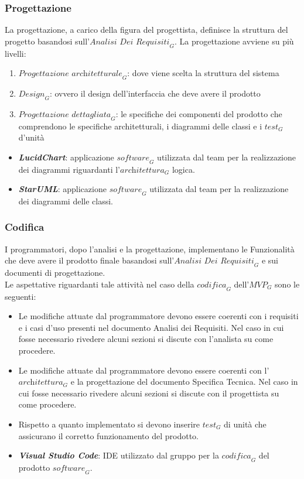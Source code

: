 \subsubsection{Progettazione}
La progettazione, a carico della figura del progettista, definisce la struttura del progetto basandosi sull'$\textit{Analisi Dei Requisiti}_G$.
La progettazione avviene su più livelli:
\begin{enumerate}
    \item $\textit{Progettazione architetturale}_G$: dove viene scelta la struttura del sistema
    \item $\textit{Design}_G$: ovvero il design dell'interfaccia che deve avere il prodotto
    \item $\textit{Progettazione dettagliata}_G$: le specifiche dei componenti del prodotto che comprendono le specifiche architetturali, i diagrammi delle classi e i $\textit{test}_G$ d'unità
\end{enumerate}
\begin{itemize}
    \item \emph{\textbf{LucidChart}}: applicazione $\textit{software}_G$ utilizzata dal team per la realizzazione dei diagrammi riguardanti l'$\textit{architettura}_G$ logica.
    \item \emph{\textbf{StarUML}}: applicazione $\textit{software}_G$ utilizzata dal team per la realizzazione dei diagrammi delle classi.
\end{itemize}
\subsubsection{Codifica}
I programmatori, dopo l'analisi e la progettazione, implementano le Funzionalità che deve avere il prodotto finale basandosi sull'$\textit{Analisi Dei Requisiti}_G$ e sui documenti di progettazione.\\
Le aspettative riguardanti tale attività nel caso della $\textit{codifica}_G$ dell'$\textit{MVP}_G$ sono le seguenti:
\begin{itemize}
    \item  Le modifiche attuate dal programmatore devono essere coerenti con i requisiti e i casi d'uso presenti nel documento Analisi dei Requisiti.
    Nel caso in cui fosse necessario rivedere alcuni sezioni si discute con l'analista su come procedere.
    \item Le modifiche attuate dal programmatore devono essere coerenti con l'$\textit{architettura}_G$ e la progettazione del documento Specifica Tecnica. Nel caso in cui fosse necessario rivedere alcuni sezioni si discute con il progettista su come procedere.
    \item Rispetto a quanto implementato si devono inserire $\textit{test}_G$ di unità che assicurano il corretto funzionamento del prodotto.
\end{itemize}
\begin{itemize}
    \item \emph{\textbf{Visual Studio Code}}: IDE utilizzato dal gruppo per la $\textit{codifica}_G$ del prodotto $\textit{software}_G$.
\end{itemize}